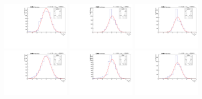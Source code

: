 \begin{figure}[!htbp]
\begin{center}
\includegraphics[width=0.3\textwidth]{figures_and_tables/modeling_xchecks/plots/HToUpsilon1SPhoton_Cat0_signalStrenght_100000/pulls}
\includegraphics[width=0.3\textwidth]{figures_and_tables/modeling_xchecks/plots/HToUpsilon2SPhoton_Cat0_signalStrenght_100000/pulls}
\includegraphics[width=0.3\textwidth]{figures_and_tables/modeling_xchecks/plots/HToUpsilon3SPhoton_Cat0_signalStrenght_100000/pulls}
\includegraphics[width=0.3\textwidth]{figures_and_tables/modeling_xchecks/plots/HToUpsilon1SPhoton_Cat0_signalStrenght_200000/pulls}
\includegraphics[width=0.3\textwidth]{figures_and_tables/modeling_xchecks/plots/HToUpsilon2SPhoton_Cat0_signalStrenght_200000/pulls}
\includegraphics[width=0.3\textwidth]{figures_and_tables/modeling_xchecks/plots/HToUpsilon3SPhoton_Cat0_signalStrenght_200000/pulls}

\end{center}
\end{figure}
